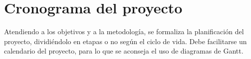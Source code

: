 \section{Cronograma del proyecto}
\label{sec:projectSchedule}

\begin{shaded}
Atendiendo a los objetivos y a la metodología, se formaliza la planificación del proyecto, dividiéndolo en etapas o no según el ciclo de vida. Debe facilitarse un calendario del proyecto, para lo que se aconseja el uso de diagramas de Gantt.
\end{shaded}